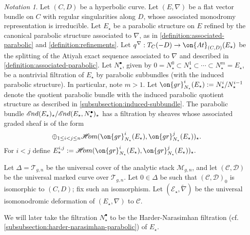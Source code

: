 \documentclass[12 pt]{amsart}
\theoremstyle{plain}
\theoremstyle{definition}
\theoremstyle{remark}
\newtheorem{notation}[subsubsection]{Notation}
\numberwithin{equation}{section}
\newcommand*{\sheafhom}{\mathscr{H}\kern -2pt om}
\newcommand*{\sheafend}{\mathscr{E}\kern -1pt nd}
\begin{document}
\begin{notation}
	\label{notation:graded-E}
	Let $(C, D)$ be a hyperbolic curve.
Let $(E, \nabla)$ be a flat vector bundle on $C$ with regular singularities along $D$, whose
associated monodromy representation is irreducible. 
Let $E_\star$ be a parabolic structure on $E$ refined by the canonical parabolic structure associated to $\nabla$, as in \autoref{definition:associated-parabolic} and
\autoref{definition:refinements}. Let $q^\nabla: T_C(-D) \to \on{At}_{(C,D)}(E_\star)$ be the splitting of the Atiyah exact sequence associated to $\nabla$ and described in \autoref{definition:associated-parabolic}.
Let
$N^\bullet_\star$, given by $0 = N^0_\star \subset N^1_\star \subset \cdots
\subset N^m_\star = E_\star$, be a
nontrivial filtration of $E_\star$ by parabolic subbundles (with the induced parabolic structure). In particular, note $m > 1$.
Let $\on{gr}^i_{N_\star}(E_\star) := N_\star^i/N_\star^{i-1}$ denote the
quotient parabolic bundle with the induced parabolic quotient structure as described in
\autoref{subsubsection:induced-subbundle}.
The parabolic bundle $\sheafend(E_\star)_\star /\sheafend(E_\star, N^\bullet_\star)_\star$ has a filtration 
	by sheaves whose
associated graded sheaf is of the form
\begin{align*}
	\oplus_{1 \leq i< j \leq n} \sheafhom(\on{gr}^i_{N_\star}(E_\star),
	\on{gr}^{j}_{N_\star}(E_\star))_\star.
\end{align*}
For $i<j$ define $E_\star^{i,j} :=
\sheafhom(\on{gr}^i_{N_\star}(E_\star),\on{gr}^{j}_{N_\star}(E_\star))_\star.$

Let $\Delta=\mathscr{T}_{g,n}$ be the universal cover of the analytic stack
$\mathscr{M}_{g,n}$, and let $(\mathscr{C}, \mathscr{D})$ be the universal
marked curve over $\mathscr{T}_{g,n}$. Let $0\in \Delta$ be such that
$(\mathscr{C}, \mathscr{D})_0$ is isomorphic to $(C,D)$; fix such an
isomorphism. Let $(\mathscr{E_\star}, \widetilde{\nabla})$ be the universal
isomonodromic deformation of $(E_\star, \nabla)$ to $\mathscr{C}$.
\end{notation}
We will later take the filtration $N_\star^\bullet$ to be the Harder-Narasimhan
filtration (cf. \autoref{subsubsection:harder-narasimhan-parabolic}) of $E_\star$.
%
\end{document}
